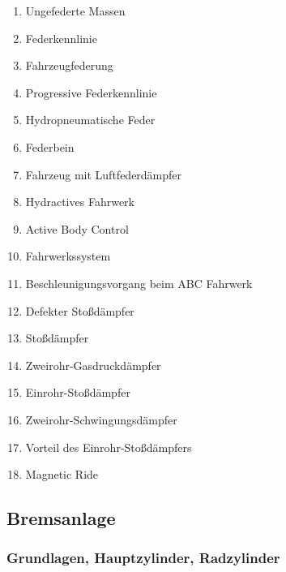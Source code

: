 \begin{enumerate}
\item
  Ungefederte Massen\\
\item
  Federkennlinie\\
\item
  Fahrzeugfederung\\
\item
  Progressive Federkennlinie\\
\item
  Hydropneumatische Feder\\
\item
  Federbein\\
\item
  Fahrzeug mit Luftfederdämpfer\\
\item
  Hydractives Fahrwerk\\
\item
  Active Body Control\\
\item
  Fahrwerkssystem\\
\item
  Beschleunigungsvorgang beim ABC Fahrwerk\\
\item
  Defekter Stoßdämpfer\\
\item
  Stoßdämpfer\\
\item
  Zweirohr-Gasdruckdämpfer\\
\item
  Einrohr-Stoßdämpfer\\
\item
  Zweirohr-Schwingungsdämpfer\\
\item
  Vorteil des Einrohr-Stoßdämpfers\\
\item
  Magnetic Ride
\end{enumerate}

\subsection{Bremsanlage}\label{bremsanlage}

\subsubsection{Grundlagen, Hauptzylinder,
Radzylinder}\label{grundlagen-hauptzylinder-radzylinder}

